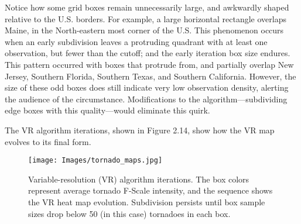 Notice how some grid boxes remain unnecessarily large, and awkwardly shaped relative to the U.S. borders. For example, a large horizontal rectangle overlaps Maine, in the North-eastern most corner of the U.S. This phenomenon occurs when an early subdivision leaves a protruding quadrant with at least one observation, but fewer than the cutoff; and the early iteration box size endures. This pattern occurred with boxes that protrude from, and partially overlap New Jersey, Southern Florida, Southern Texas, and Southern California. However, the size of these odd boxes does still indicate very low observation density, alerting the audience of the circumstance. Modifications to the algorithm---subdividing edge boxes with this quality---would eliminate this quirk.

The VR algorithm iterations, shown in Figure 2.14, show how the VR map evolves to its final form.
        \begin{figure}[H]
      	\centering      
      	\texttt{[image: Images/tornado\_maps.jpg]}
      	\caption{Variable-resolution (VR) algorithm iterations. The box colors represent average tornado F-Scale intensity, and the sequence shows the VR heat map evolution. Subdivision persists until box sample sizes drop below 50 (in this case) tornadoes in each box.}
        \end{figure}
        
